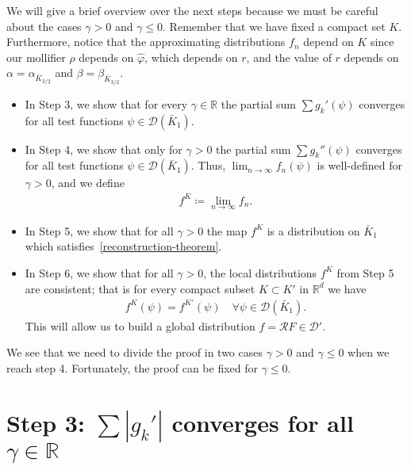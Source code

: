 We will give a brief overview over the next steps because we must be careful about the cases \(\gamma > 0\) and \( \gamma \leq 0 \). Remember that we have fixed a compact set \(K\). Furthermore, notice that the approximating distributions \(f_n\) depend on \(K\) since our mollifier \(\rho\) depends on \(\hat \varphi\), which depends on \(r\), and the value of \(r\) depends on \(\alpha = \alpha_{\bar K_{3/2}}\) and \(\beta = \beta_{\bar K_{3/2}}\).
\begin{itemize}
    \item In Step 3, we show that for every \(\gamma \in \mathbb{R}\) the partial sum \(\sum g_k'(\psi)\) converges for all test functions \(\psi \in \mathcal{D}(\bar K_1)\).
    \item In Step 4, we show that only for \(\gamma > 0\) the partial sum \(\sum g_k''(\psi)\) converges for all test functions \(\psi \in \mathcal{D}(\bar K_1)\). Thus, \(\lim_{n \to \infty} f_n(\psi)\) is well-defined for \(\gamma > 0\), and we define 
    \begin{align*}
        f^K \coloneqq \lim_{n \to \infty}f_n.
    \end{align*}
    \item In Step 5, we show that for all \(\gamma > 0\) the map \(f^K\) is a distribution on \(\bar K_1\) which satisfies~\eqref{reconstruction-theorem}.
    \item In Step 6, we show that for all \(\gamma > 0\), the local distributions \(f^K\) from Step 5 are consistent; that is for every compact subset \( K \subset K' \) in \( \mathbb{R}^d \) we have
    \begin{align*}
        f^{K}(\psi) = f^{K'}(\psi) \quad \forall \psi \in \mathcal{D}(\bar K_1).
    \end{align*}
    This will allow us to build a global distribution \(f = \mathcal{R}F \in \mathcal{D}'\).
\end{itemize}
We see that we need to divide the proof in two cases \(\gamma > 0\) and \(\gamma \leq 0\) when we reach step 4. Fortunately, the proof can be fixed for \(\gamma \leq 0\).

\section{Step 3: \texorpdfstring{\(\sum |g_k'|\) converges for all \(\gamma \in \mathbb{R}\)}{Sum gk converges for all real gamma}}\label{chapter:step-3}

